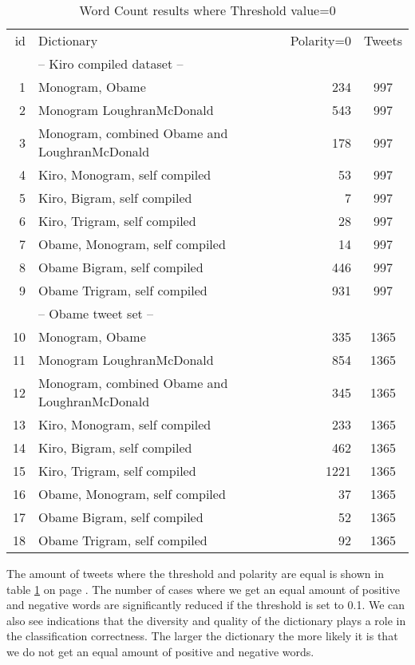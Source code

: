 \begin{table}
\centering
\label{tbl:word_counting_polarity_null}
\caption{Word Count results where Threshold value=0}
\begin{tabular}{ r p{6cm} r c }
id & Dictionary & Polarity=0 & Tweets \\
& -- Kiro compiled dataset -- & & \\
\hline
1 & Monogram, Obame & 234 & 997 \\ 
2 & Monogram LoughranMcDonald & 543 & 997 \\ 
3 & Monogram, combined Obame and LoughranMcDonald & 178 & 997 \\
4 & Kiro, Monogram, self compiled & 53 & 997 \\
5 & Kiro, Bigram, self compiled & 7 & 997 \\
6 & Kiro, Trigram, self compiled & 28 & 997 \\
7 & Obame, Monogram, self compiled & 14 & 997 \\
8 & Obame Bigram, self compiled & 446 & 997 \\
9 & Obame Trigram, self compiled & 931 & 997 \\

& -- Obame tweet set -- & & \\
\hline
10 & Monogram, Obame & 335 & 1365 \\ 
11 & Monogram LoughranMcDonald & 854 & 1365 \\
12 & Monogram, combined Obame and LoughranMcDonald & 345 & 1365 \\
13 & Kiro, Monogram, self compiled & 233 & 1365 \\
14 & Kiro, Bigram, self compiled & 462 & 1365 \\
15 & Kiro, Trigram, self compiled & 1221 & 1365 \\
16 & Obame, Monogram, self compiled & 37 & 1365 \\
17 & Obame Bigram, self compiled & 52 & 1365 \\
18 & Obame Trigram, self compiled & 92 & 1365 \\
\end{tabular}
\end{table}

The amount of tweets where the threshold and polarity are equal is shown in table
\ref{tbl:word_counting_polarity_null} on page \pageref{tbl:word_counting_polarity_null}. The number of cases where we
get an equal amount of positive and negative words are significantly reduced if
the threshold is set to 0.1. We can also see indications that the diversity and
quality of the dictionary plays a role in the classification correctness. The
larger the dictionary the more likely it is that we do not get an equal
amount of positive and negative words.  
%

